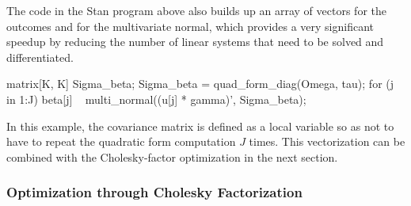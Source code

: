 The code in the Stan program above also builds up an array of vectors
for the outcomes and for the multivariate normal, which provides a
very significant speedup by reducing the number of linear systems that
need to be solved and differentiated.  
%
\begin{stancode}
  {
    matrix[K, K] Sigma_beta;
    Sigma_beta = quad_form_diag(Omega, tau);
    for (j in 1:J)
      beta[j] ~ multi_normal((u[j] * gamma)', Sigma_beta);
  }
\end{stancode}
%
In this example, the covariance matrix  is defined
as a local variable so as not to have to repeat the quadratic form
computation $J$ times.  This vectorization can be combined with the
Cholesky-factor optimization in the next section.

\subsubsection{Optimization through Cholesky Factorization}

